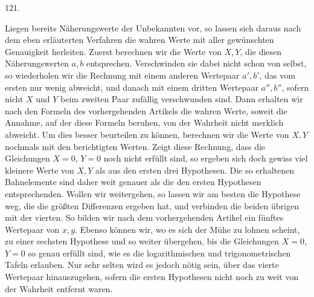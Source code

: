 \par{}\medskip
\begin{center}\hypertarget{native-168-article121}{}121.\end{center}
Liegen bereits Näherungswerte der Unbekannten vor, so lassen sich daraus nach dem eben erläuterten Verfahren die wahren Werte mit aller gewünschten Genauigkeit herleiten. Zuerst berechnen wir die Werte von $X,Y$, die diesen Näherungswerten $a,b$ entsprechen. Verschwinden sie dabei nicht schon von selbst, so wiederholen wir die Rechnung mit einem anderen Wertepaar $a',b'$, das vom ersten nur wenig abweicht, und danach mit einem dritten Wertepaar $a'',b''$, sofern nicht $X$ und $Y$ beim zweiten Paar zufällig verschwunden sind. Dann erhalten wir nach den Formeln des vorhergehenden Artikels die wahren Werte, soweit die Annahme, auf der diese Formeln beruhen, von der Wahrheit nicht merklich abweicht. Um dies besser beurteilen zu können, berechnen wir die Werte von $X,Y$ nochmals mit den berichtigten Werten. Zeigt diese Rechnung, dass die Gleichungen $X=0$, $Y=0$ noch nicht erfüllt sind, so ergeben sich doch gewiss viel kleinere Werte von $X,Y$ als aus den ersten drei Hypothesen. Die so erhaltenen Bahnelemente sind daher weit genauer als die den ersten Hypothesen entsprechenden. Wollen wir weitergehen, so lassen wir am besten die Hypothese weg, die die größten Differenzen ergeben hat, und verbinden die beiden übrigen mit der vierten. So bilden wir nach dem vorhergehenden Artikel ein fünftes Wertepaar von $x,y$. Ebenso können wir, wo es sich der Mühe zu lohnen scheint, zu einer sechsten Hypothese und so weiter übergehen, bis die Gleichungen $X=0$, $Y=0$ so genau erfüllt sind, wie es die logarithmischen und trigonometrischen Tafeln erlauben. Nur sehr selten wird es jedoch nötig sein, über das vierte Wertepaar hinauszugehen, sofern die ersten Hypothesen nicht noch zu weit von der Wahrheit entfernt waren.
